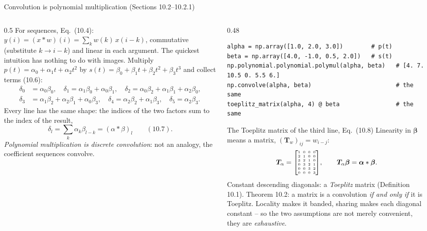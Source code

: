 \documentclass[10pt,aspectratio=169]{beamer}
\begin{document}
\begin{frame}[fragile]{Convolution is polynomial multiplication (Sections 10.2--10.2.1)}
\begin{columns}[T]
\begin{column}{0.5\textwidth}
\scriptsize
For sequences, Eq.~(10.4): $y(i)=(x*w)(i)=\sum_{k}w(k)\,x(i-k)$,
commutative (substitute $k\to i-k$) and linear in each argument.  The
quickest intuition has nothing to do with images.  Multiply
$p(t)=\alpha_0+\alpha_1t+\alpha_2t^{2}$ by
$s(t)=\beta_0+\beta_1t+\beta_2t^{2}+\beta_3t^{3}$ and collect terms
(10.6):
\begin{align*}
  \delta_0&=\alpha_0\beta_0,\quad
  \delta_1=\alpha_1\beta_0+\alpha_0\beta_1,\quad
  \delta_2=\alpha_0\beta_2+\alpha_1\beta_1+\alpha_2\beta_0,\\
  \delta_3&=\alpha_1\beta_2+\alpha_2\beta_1+\alpha_0\beta_3,\quad
  \delta_4=\alpha_2\beta_2+\alpha_1\beta_3,\quad
  \delta_5=\alpha_2\beta_3 .
\end{align*}
Every line has the same shape: the indices of the two factors sum to the
index of the result,
\[
  \delta_l=\sum_k\alpha_k\beta_{l-k}=(\alpha*\beta)_l\qquad(10.7).
\]
\emph{Polynomial multiplication is discrete convolution}: not an analogy,
the coefficient sequences convolve.
\end{column}
\begin{column}{0.48\textwidth}
\begin{lstlisting}
alpha = np.array([1.0, 2.0, 3.0])        # p(t)
beta = np.array([4.0, -1.0, 0.5, 2.0])   # s(t)
np.polynomial.polynomial.polymul(alpha, beta)   # [4. 7. 10.5 0. 5.5 6.]
np.convolve(alpha, beta)                        # the same
toeplitz_matrix(alpha, 4) @ beta                # the same
\end{lstlisting}
\begin{block}{The Toeplitz matrix of the third line, Eq.~(10.8)}
\scriptsize
Linearity in $\bm{\beta}$ means a matrix, $(\bm{T}_w)_{ij}=w_{i-j}$:
\[
  \setlength{\arraycolsep}{2pt}
  \bm{T}_{\alpha}=
  {\tiny\begin{bmatrix}
    1&0&0&0\\ 2&1&0&0\\ 3&2&1&0\\ 0&3&2&1\\ 0&0&3&2\\ 0&0&0&3
  \end{bmatrix}},\qquad
  \bm{T}_{\alpha}\bm{\beta}=\bm{\alpha}*\bm{\beta}.
\]
Constant descending diagonals: a \emph{Toeplitz} matrix (Definition
10.1).  Theorem 10.2: a matrix is a convolution \emph{if and only if} it is
Toeplitz.  Locality makes it banded, sharing makes each diagonal constant
-- so the two assumptions are not merely convenient, they are
\emph{exhaustive}.
\end{block}
\end{column}
\end{columns}
\end{frame}
\end{document}
